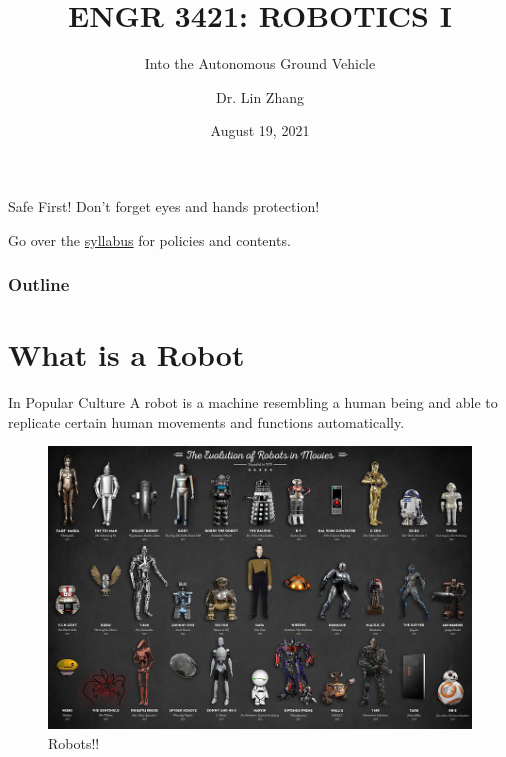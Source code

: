 \documentclass[12pt,letterpaper]{beamer}
\title[Robotics I]
{ENGR 3421: ROBOTICS I}
\subtitle{Into the Autonomous Ground Vehicle}
\author[Zhang, Lin]
{Dr. Lin Zhang}
\institute[UCA] %
{
  Department of Physics and Astronomy\\
  University of Central Arkansas
}
\date[Robotics1 2021] %
{August 19, 2021}
\begin{document}
\frame{\titlepage}
\begin{frame}
    \begin{alertblock}{Safe First!}
        Don't forget eyes and hands protection!
    \end{alertblock}
    Go over the \href{https://github.com/linzhangUCA/robotics1-2021/blob/main/syllabus_fall2021.pdf}{syllabus} for policies and contents.
\end{frame}

\begin{frame}
\frametitle{Outline}
\tableofcontents
\end{frame}


\section{What is a Robot}

\begin{frame}{In Popular Culture}
    A robot is a machine resembling a human being and able to replicate certain human movements and functions automatically.
    \begin{figure}
        \includegraphics{evolution-of-robots-in-movies.jpeg}
        \caption{Robots!!}
    \end{figure}
\end{frame}
\end{document}
